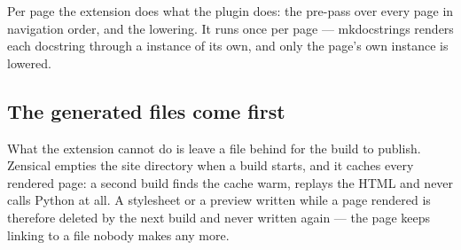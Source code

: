 \documentclass[a4paper,twoside]{article}
\begin{document}
Per page the extension does what the plugin does: the pre-pass over every page
in navigation order, and the lowering. It runs once per page --- mkdocstrings
renders each docstring through a  instance of its own, and only the
page's own instance is lowered.
\subsection{The generated files come first}
What the extension cannot do is leave a file behind for the build to publish.
Zensical empties the site directory when a build starts, and it caches every
rendered page: a second build finds the cache warm, replays the HTML and never
calls Python at all. A stylesheet or a preview written while a page rendered is
therefore deleted by the next build and never written again --- the page keeps
linking to a file nobody makes any more.
\end{document}
